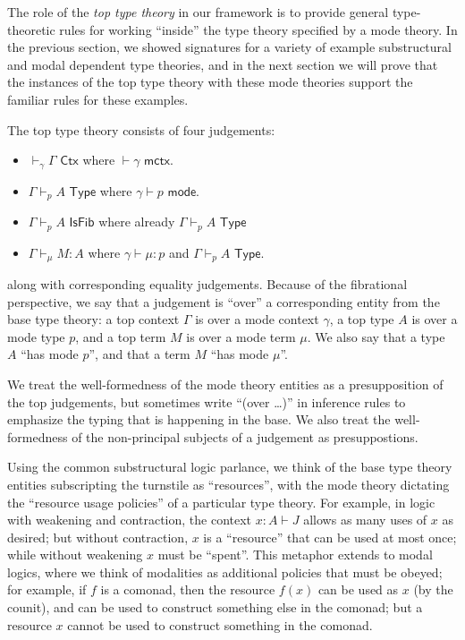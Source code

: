 \documentclass[10pt]{article}
\theoremstyle{definition}
\newcommand{\yields}{\vdash}
\newcommand{\CTX}{\,\,\mathsf{Ctx}}
\newcommand{\ctx}{\,\,\mathsf{mctx}}
\newcommand{\TYPE}{\,\,\mathsf{Type}}
\newcommand{\type}{\,\,\mathsf{mode}}
\newcommand{\ISFIB}{\,\,\mathsf{IsFib}}
\begin{document}
The role of the \emph{top type theory} in our framework is to provide
general type-theoretic rules for working ``inside'' the type theory
specified by a mode theory.  In the previous section, we showed
signatures for a variety of example substructural and modal dependent
type theories, and in the next section we will prove that the instances
of the top type theory with these mode theories support the familiar
rules for these examples.

The top type theory consists of four judgements: 
\begin{itemize}
\item $\yields_\gamma \Gamma \CTX$ where $\yields \gamma \ctx$.
\item $\Gamma \yields_p A \TYPE$ where $\gamma \yields p \type$.
\item $\Gamma \yields_p A \ISFIB$ where already $\Gamma \yields_p A \TYPE$
\item $\Gamma \yields_\mu M : A$ where $\gamma \yields \mu : p$ and
  $\Gamma \yields_p A \TYPE$.
\end{itemize}
along with corresponding equality judgements.  Because of the
fibrational perspective, we say that a judgement is ``over'' a
corresponding entity from the base type theory: a top context $\Gamma$
is over a mode context $\gamma$, a top type $A$ is over a mode type $p$,
and a top term $M$ is over a mode term $\mu$.  We also say that a type $A$
``has mode $p$'', and that a term $M$ ``has mode $\mu$''. 

We treat the well-formedness of the mode theory entities as a
presupposition of the top judgements, but sometimes write ``(over
\ldots)'' in inference rules to emphasize the typing that is happening
in the base.  We also treat the well-formedness of the non-principal
subjects of a judgement as presuppostions.

Using the common substructural logic parlance, we think of the base type
theory entities subscripting the turnstile as ``resources'', with the
mode theory dictating the ``resource usage policies'' of a particular
type theory.  For example, in logic with weakening and contraction, the
context $x : A \vdash J$ allows as many uses of $x$ as desired; but
without contraction, $x$ is a ``resource'' that can be used at most
once; while without weakening $x$ must be ``spent''.  This metaphor
extends to modal logics, where we think of modalities as additional
policies that must be obeyed; for example, if $f$ is a comonad, then the
resource $f(x)$ can be used as $x$ (by the counit), and can be used to
construct something else in the comonad; but a resource $x$ cannot be
used to construct something in the comonad.
\end{document}
